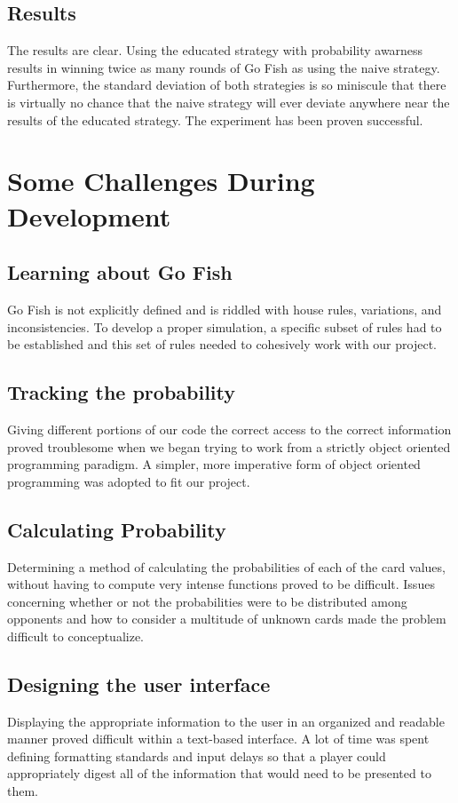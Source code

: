 \documentclass[preprint,12pt]{elsarticle}
\begin{document}
\subsection{Results}

The results are clear. Using the educated strategy with probability awarness results in winning twice as many rounds of Go Fish as using the naive strategy. Furthermore, the standard deviation of both strategies is so miniscule that there is virtually no chance that the naive strategy will ever deviate anywhere near the results of the educated strategy. The experiment has been proven successful.

\section{Some Challenges During Development}
\label{S:3}

\subsection{Learning about Go Fish}
Go Fish is not explicitly defined and is riddled with house rules, variations, and inconsistencies. To develop a proper simulation, a specific subset of rules had to be established and this set of rules needed to cohesively work with our project.

\subsection{Tracking the probability}
Giving different portions of our code the correct access to the correct information proved troublesome when we began trying to work from a strictly object oriented programming paradigm. A simpler, more imperative form of object oriented programming was adopted to fit our project. 

\subsection{Calculating Probability}
Determining a method of calculating the probabilities of each of the card values, without having to compute very intense functions proved to be difficult. Issues concerning whether or not the probabilities were to be distributed among opponents and how to consider a multitude of unknown cards made the problem difficult to conceptualize. 

\subsection{Designing the user interface}
Displaying the appropriate information to the user in an organized and readable manner proved difficult within a text-based interface. A lot of time was spent defining formatting standards and input delays so that a player could appropriately digest all of the information that would need to be presented to them.
\end{document}
